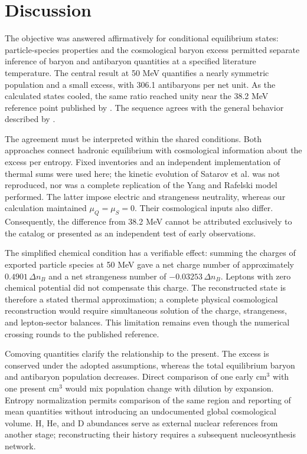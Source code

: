 \section{Discussion}
The objective was answered affirmatively for conditional equilibrium states: particle-species properties and the cosmological baryon excess permitted separate inference of baryon and antibaryon quantities at a specified literature temperature. The central result at 50 MeV quantifies a nearly symmetric population and a small excess, with 306.1 antibaryons per net unit. As the calculated states cooled, the same ratio reached unity near the 38.2 MeV reference point published by \citet{Yang2022}. The sequence agrees with the general behavior described by \citet{Satarov2013}.

The agreement must be interpreted within the shared conditions. Both approaches connect hadronic equilibrium with cosmological information about the excess per entropy. Fixed inventories and an independent implementation of thermal sums were used here; the kinetic evolution of Satarov et al. was not reproduced, nor was a complete replication of the Yang and Rafelski model performed. The latter impose electric and strangeness neutrality, whereas our calculation maintained $\mu_Q=\mu_S=0$. Their cosmological inputs also differ. Consequently, the difference from 38.2 MeV cannot be attributed exclusively to the catalog or presented as an independent test of early observations.

The simplified chemical condition has a verifiable effect: summing the charges of exported particle species at 50 MeV gave a net charge number of approximately $0.4901\,\Delta n_B$ and a net strangeness number of $-0.03253\,\Delta n_B$. Leptons with zero chemical potential did not compensate this charge. The reconstructed state is therefore a stated thermal approximation; a complete physical cosmological reconstruction would require simultaneous solution of the charge, strangeness, and lepton-sector balances. This limitation remains even though the numerical crossing rounds to the published reference.

Comoving quantities clarify the relationship to the present. The excess is conserved under the adopted assumptions, whereas the total equilibrium baryon and antibaryon population decreases. Direct comparison of one early cm$^3$ with one present cm$^3$ would mix population change with dilution by expansion. Entropy normalization permits comparison of the same region and reporting of mean quantities without introducing an undocumented global cosmological volume. H, He, and D abundances serve as external nuclear references from another stage; reconstructing their history requires a subsequent nucleosynthesis network.

